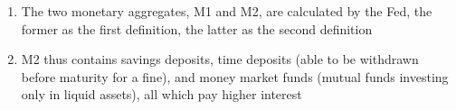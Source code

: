 \documentclass[11 pt, twoside]{article}
\begin{document}
\begin{enumerate}
\begin{enumerate}
\item The two monetary aggregates, M1 and M2, are calculated by the Fed, the former as the first definition, the latter as the second definition
\item M2 thus contains savings deposits, time deposits (able to be withdrawn before maturity for a fine), and money market funds (mutual funds investing only in liquid assets), all which pay higher interest
\end{enumerate}
\end{enumerate}
\end{document}
